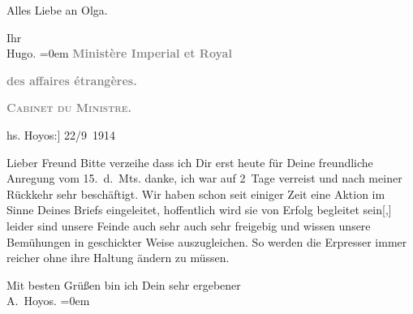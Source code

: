 \pstart
           Alles Liebe an Olga.\pend
           
\pstart
           Ihr{\\[\baselineskip]}\spacefill\mbox{Hugo.}\pend
           \leftskip=0em{}\vspace{1em}{\vspace{1\baselineskip}}
\pstart
           {\pb}\textcolor{gray}{\textbf{Ministère Imperial et Royal}}\pend
           
\pstart
           \textcolor{gray}{\textbf{des affaires étrangères.}}\pend
           
\pstart
           \textcolor{gray}{\textbf{\textsc{Cabinet du Ministre.}}}\pend
           
\pstart
           \raggedleft{}{[}hs. Hoyos:{]} 22/9 1914\pend
           
\pstart{}Lieber Freund\pend\vspace{0.5em}
\pstart
           Bitte verzeihe dass ich Dir erst heute für Deine freundliche Anregung vom
                  15. d. Mts. danke, ich war auf 2 Tage verreist und nach meiner
               Rückkehr sehr beschäftigt. Wir haben schon seit einiger Zeit eine Aktion im Sinne
               Deines Briefs {\pb}eingeleitet,
               hoffentlich wird sie von Erfolg begleitet sein{[},{]} leider sind
               unsere Feinde auch sehr auch sehr freigebig und wissen unsere Bemühungen in
               geschickter Weise auszugleichen. So werden die Erpresser immer reicher ohne ihre
               Haltung ändern zu müssen.\pend
           
\pstart
           Mit besten Grüßen bin ich {\pb}Dein sehr ergebener {\\[\baselineskip]}\spacefill\mbox{A. Hoyos.}\pend
           \leftskip=0em{}\endnumbering{}  \newcommand{\dateiname}{L02197}\newcommand{\titel}{Hugo von Hofmannsthal an Arthur Schnitzler, 24. 9. [1914]}\newcommand{\editorInnen}{Martin Anton Müller und Gerd-Hermann Susen}
